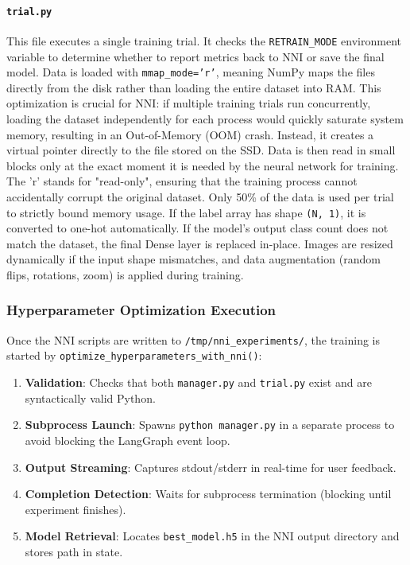 \paragraph{\texttt{trial.py}}
This file executes a single training trial. It checks the \texttt{RETRAIN\_MODE} environment variable to determine whether to report metrics back to NNI or save the final model. Data is loaded with \texttt{mmap\_mode='r'}, meaning NumPy maps the files directly from the disk rather than loading the entire dataset into RAM. This optimization is crucial for NNI: if multiple training trials run concurrently, loading the dataset independently for each process would quickly saturate system memory, resulting in an Out-of-Memory (OOM) crash. Instead, it creates a virtual pointer directly to the file stored on the SSD. Data is then read in small blocks only at the exact moment it is needed by the neural network for training. The 'r' stands for "read-only", ensuring that the training process cannot accidentally corrupt the original dataset.
Only 50\% of the data is used per trial to strictly bound memory usage. If the label array has shape \texttt{(N, 1)}, it is converted to one-hot automatically. If the model's output class count does not match the dataset, the final Dense layer is replaced in-place. Images are resized dynamically if the input shape mismatches, and data augmentation (random flips, rotations, zoom) is applied during training.

\subsubsection{Hyperparameter Optimization Execution}

Once the NNI scripts are written to \texttt{/tmp/nni\_experiments/}, the training is started by \texttt{optimize\_\allowbreak hyperparameters\_\allowbreak with\_\allowbreak nni()}:

\begin{enumerate}[noitemsep, topsep=2pt]
  \item \textbf{Validation}: Checks that both \texttt{manager.py} and \texttt{trial.py} exist and are syntactically valid Python.
  \item \textbf{Subprocess Launch}: Spawns \texttt{python manager.py} in a separate process to avoid blocking the LangGraph event loop.
  \item \textbf{Output Streaming}: Captures stdout/stderr in real-time for user feedback.
  \item \textbf{Completion Detection}: Waits for subprocess termination (blocking until experiment finishes).
  \item \textbf{Model Retrieval}: Locates \texttt{best\_model.h5} in the NNI output directory and stores path in state.
\end{enumerate}

